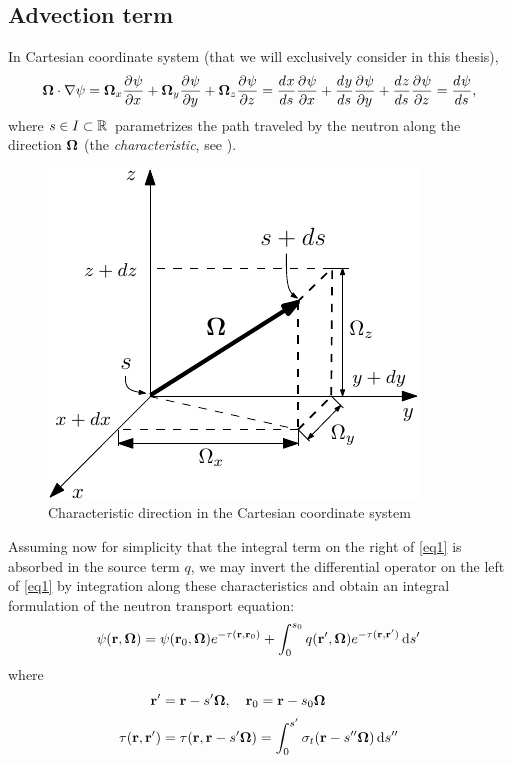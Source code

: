 \subsection{Advection term}\label{sec:advection}
In Cartesian coordinate system (that we will exclusively consider in this thesis),
$$
	\mathbf{\Omega}\cdot\nabla\psi = \mathbf{\Omega}_x\frac{\partial^{}\psi}{\partial x^{}} + \mathbf{\Omega}_y\frac{\partial^{}\psi}{\partial y^{}} + \mathbf{\Omega}_z\frac{\partial^{}\psi}{\partial z^{}} = 
	\frac{{d}^{}{x}}{{d} {s}^{}}\frac{\partial^{}\psi}{\partial x^{}} + \frac{{d}^{}{y}}{{d} {s}^{}}\frac{\partial^{}\psi}{\partial y^{}} + \frac{{d}^{}{z}}{{d} {s}^{}}\frac{\partial^{}\psi}{\partial z^{}} = \frac{{d}^{}{\psi}}{{d} {s}^{}},
$$
where $s\in I\subset \mathbb{R}^{}$ parametrizes the path traveled by the neutron along the direction $\mathbf{\Omega}$ (the
\textit{characteristic}, see ).
\begin{figure}[btp]
\begin{center}
  \includegraphics[scale=1.2]{cartesian_streaming2}
  \caption{Characteristic direction in the Cartesian coordinate system}
  \label{fig:cartesian2}
\end{center}
\end{figure}
Assuming now for simplicity that the integral term on the right of \eqref{eq1} is absorbed in the source term
$q$, we may invert the differential operator on the left of \eqref{eq1} by integration along these characteristics and obtain an
integral formulation of the neutron transport equation:
\begin{equation}\label{eq:nte-integral}
	\psi(\mathbf{r},\mathbf{\Omega}) = \psi(\mathbf{r}_0,\mathbf{\Omega})e^{-\tau(\mathbf{r},\mathbf{r}_0)} + \int_0^{s_0}
	q(\mathbf{r}',\mathbf{\Omega})e^{-\tau(\mathbf{r},\mathbf{r}')}\,\text{d}s'\,
\end{equation}
where
\begin{align}
	\mathbf{r}' &= \mathbf{r} - s' \mathbf{\Omega}, \quad \mathbf{r}_0 = \mathbf{r} - s_0 \mathbf{\Omega}\nonumber\\[.2em]
	\tau(\mathbf{r},\mathbf{r}') &= \tau(\mathbf{r},\mathbf{r}-s'\mathbf{\Omega}) = \int_0^{s'} \sigma_t(\mathbf{r} - s''\mathbf{\Omega})\,\text{d}s''\, \label{eq:tau}
\end{align}
